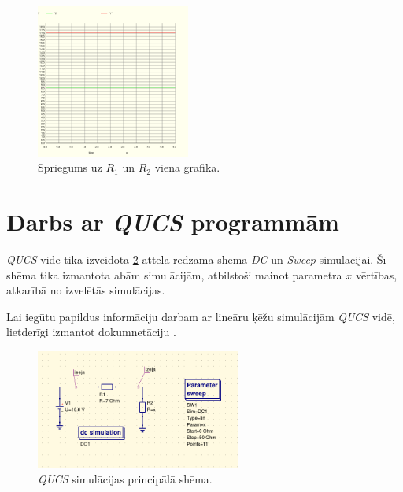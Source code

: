 \documentclass[12pt,table]{report}
\begin{document}
\begin{figure}[H]
    \centering
		\includegraphics[width=0.45\textwidth]{img/plot3.png}
    \caption{Spriegums uz $R_1$ un $R_2$ vienā grafikā.}
    \label{fig:r1_r2_single}
\end{figure}

\section{Darbs ar \emph{QUCS} programmām}
\emph{QUCS} vidē tika izveidota \ref{fig:qucs_schem} attēlā redzamā shēma \emph{DC} un \emph{Sweep}
simulācijai. Šī shēma tika izmantota abām simulācijām, atbilstoši mainot parametra $x$ vērtības,
atkarībā no izvelētās simulācijas.

Lai iegūtu papildus informāciju darbam ar lineāru ķēžu simulācijām \emph{QUCS} vidē, lietderīgi izmantot
dokumnetāciju \cite{qucstutorial}.

\begin{figure}[H]
    \centering
		\includegraphics[width=0.6\textwidth]{img/qucs_schem.png}
    \caption{\emph{QUCS} simulācijas principālā shēma.}
    \label{fig:qucs_schem}
\end{figure}
\end{document}
